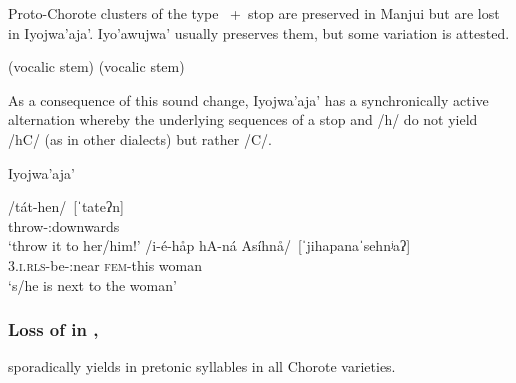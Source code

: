Proto-Chorote clusters of the type ~+~stop are preserved in Manjui but are lost in Iyojwa’aja’. Iyo’awujwa’ usually preserves them, but some variation is attested.

\begin{exe}
    \ex {}
    \ex {}
    \ex {}
    \ex {}
    \ex {} (vocalic stem)
    \ex {} (vocalic stem)
\end{exe}

As a consequence of this sound change, Iyojwa’aja’ has a synchronically active alternation whereby the underlying sequences of a stop and /h/ do not yield /hC/ (as in other dialects) but rather /C/.

\ea
Iyojwa'aja' \citep{JC14a}
    \begin{xlist}
        \ex \gll /tát-hen/~[ˈtateʔn]\\
            throw-\APPL:downwards\\
            \glt `throw it to her/him!'
        \ex \gll /i-é-håp hA-ná Asíhnå/~[ˈjihapanaˈsehnʲaʔ]\\
            3.\textsc{i.rls}-be-\APPL:near {\textsc{fem}}-this woman\\
            \glt `s/he is next to the woman'
    \end{xlist}
\z

\subsubsection{Loss of  in , }\label{ch-caida-de-h-hw-hl}

 sporadically yields  in pretonic syllables in all Chorote varieties.

\begin{exe}
    \ex {}
    \ex {}
    \ex {}
    \ex {}
\end{exe}

